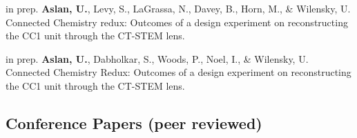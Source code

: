 \documentclass[11pt,letterpaper]{report} %
\begin{document}
    \begin{tablist}

        \item[in prep.] \tab{}\textbf{Aslan, U.}, Levy, S., LaGrassa, N., Davey, B., Horn, M., \& Wilensky, U. Connected Chemistry redux: Outcomes of a design experiment on reconstructing the CC1 unit through the CT-STEM lens.

        \item[in prep.] \tab{}\textbf{Aslan, U.}, Dabholkar, S., Woods, P., Noel, I., \& Wilensky, U. Connected Chemistry Redux: Outcomes of a design experiment on reconstructing the CC1 unit through the CT-STEM lens.

    \end{tablist}

    \subsection*{Conference Papers (peer reviewed)}
\end{document}
